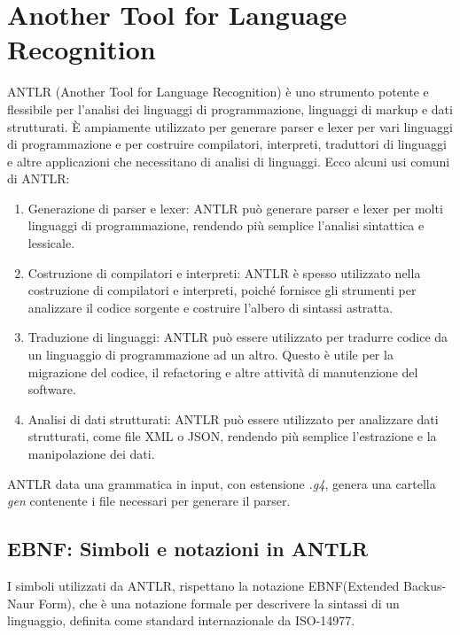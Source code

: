 \documentclass[../../main.tex]{subfiles}
\begin{document}
\section{Another Tool for Language Recognition}
ANTLR (Another Tool for Language Recognition) è uno strumento potente e flessibile per l'analisi dei linguaggi di programmazione, linguaggi di markup e dati strutturati. È ampiamente utilizzato per generare parser e lexer per vari linguaggi di programmazione e per costruire compilatori, interpreti, traduttori di linguaggi e altre applicazioni che necessitano di analisi di linguaggi.
Ecco alcuni usi comuni di ANTLR:
\begin{enumerate}
    \item Generazione di parser e lexer: ANTLR può generare parser e lexer per molti linguaggi di programmazione, rendendo più semplice l'analisi sintattica e lessicale.
    \item Costruzione di compilatori e interpreti: ANTLR è spesso utilizzato nella costruzione di compilatori e interpreti, poiché fornisce gli strumenti per analizzare il codice sorgente e costruire l'albero di sintassi astratta.
    \item Traduzione di linguaggi: ANTLR può essere utilizzato per tradurre codice da un linguaggio di programmazione ad un altro. Questo è utile per la migrazione del codice, il refactoring e altre attività di manutenzione del software.
    \item Analisi di dati strutturati: ANTLR può essere utilizzato per analizzare dati strutturati, come file XML o JSON, rendendo più semplice l'estrazione e la manipolazione dei dati.
\end{enumerate}

ANTLR data una grammatica in input, con estensione \textit{.g4}, genera una cartella \textit{gen} contenente i file necessari per generare il parser.\\

\subsection{EBNF: Simboli e notazioni in ANTLR}
I simboli utilizzati da ANTLR, rispettano la notazione EBNF(Extended Backus-Naur Form), che è una notazione formale per descrivere la sintassi di un linguaggio, definita come standard internazionale da ISO-14977.
\end{document}
